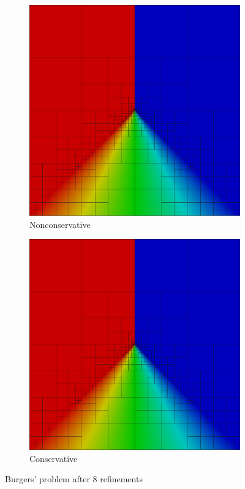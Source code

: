 \documentclass[letterpaper]{article}
\begin{document}
\begin{figure}[p]
\centering
\begin{subfigure}[t]{0.45\textwidth}
\centering
\includegraphics[width=\textwidth]{figs/Burgers/graph8nc.png}
\caption{Nonconservative}
\label{fig:burgers8nc}
\end{subfigure}
\begin{subfigure}[t]{0.45\textwidth}
\centering
\includegraphics[width=\textwidth]{figs/Burgers/graph8c.png}
\caption{Conservative}
\label{fig:burgers8c}
\end{subfigure}
\caption{Burgers' problem after 8 refinements}
\label{fig:burgers}
\end{figure}
\end{document}
